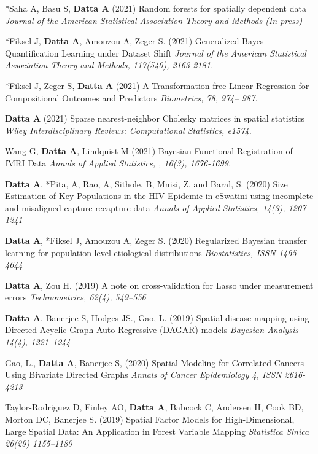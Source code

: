 \documentclass[12pt]{article}
\newcommand{\mine}{
  \addtocounter{enumi}{1}
\item[\fcolorbox{white}{grey}{\color{white} \tiny \arabic{enumi}}]
}
\begin{document}
\mine *Saha A, Basu S, \textbf{Datta A} (2021) {Random forests for spatially dependent data} {\it Journal of the American Statistical Association Theory and Methods (In press)}

\mine *Fiksel J, \textbf{Datta A}, Amouzou A, Zeger S. (2021) {Generalized Bayes Quantification Learning under Dataset Shift } {\it  Journal of the American Statistical Association Theory and Methods, 117(540), 2163-2181.}

\mine *Fiksel J, Zeger S, \textbf{Datta A} (2021) {A Transformation-free Linear Regression for Compositional Outcomes and Predictors} {\it Biometrics, 78, 974– 987.}

\mine \textbf{Datta A} (2021) {Sparse nearest-neighbor Cholesky matrices in spatial statistics} {\it  Wiley Interdisciplinary Reviews: Computational
	Statistics, e1574.}

\item Wang G, \textbf{Datta A}, Lindquist M (2021) {Bayesian Functional Registration of fMRI Data} {\it Annals of Applied Statistics, , 16(3), 1676-1699.}

\mine \textbf{Datta A}, *Pita, A, Rao, A, Sithole, B, Mnisi, Z, and Baral, S. (2020)	{Size Estimation of Key Populations in the HIV Epidemic in eSwatini using incomplete and misaligned capture-recapture data} {\it Annals of Applied Statistics, 14(3), 1207--1241 }

\mine \textbf{Datta A}, *Fiksel J, Amouzou A, Zeger S. (2020) {Regularized Bayesian transfer learning for population level etiological
	distributions} {\it Biostatistics, ISSN 1465--4644}
\mine \textbf{Datta A}, Zou H. (2019) {A note on cross-validation for Lasso under measurement
	errors} {\it Technometrics, 62(4), 549--556 }

\mine \textbf{Datta A}, Banerjee S, Hodges JS., Gao, L. (2019)  {Spatial disease mapping using
	Directed Acyclic Graph Auto-Regressive (DAGAR) models} {\it Bayesian Analysis 14(4), 1221--1244}
\item Gao, L., \textbf{Datta A}, Banerjee S, (2020) {Spatial Modeling for Correlated Cancers Using Bivariate Directed Graphs} {\it Annals of Cancer Epidemiology 	4, ISSN 2616-4213}

\item Taylor-Rodriguez D, Finley AO, \textbf{Datta A}, Babcock C, Andersen H, Cook BD,
Morton DC, Banerjee S. (2019)
{Spatial Factor Models for High-Dimensional, Large Spatial Data: An Application in Forest Variable Mapping}
{\it Statistica Sinica 26(29) 1155--1180}
\end{document}
